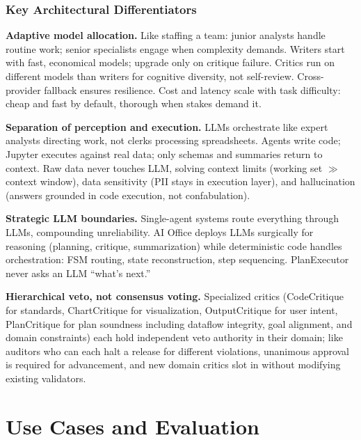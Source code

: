 \documentclass[sigconf]{acmart}
\begin{document}
\subsubsection{Key Architectural Differentiators}

\textbf{Adaptive model allocation.}\label{sec:adaptive-allocation} Like staffing a team: junior analysts handle routine work; senior specialists engage when complexity demands. Writers start with fast, economical models; upgrade only on critique failure. Critics run on different models than writers for cognitive diversity, not self-review. Cross-provider fallback ensures resilience. Cost and latency scale with task difficulty: cheap and fast by default, thorough when stakes demand it.

\textbf{Separation of perception and execution.} LLMs orchestrate like expert analysts directing work, not clerks processing spreadsheets. Agents write code; Jupyter executes against real data; only schemas and summaries return to context. Raw data never touches LLM, solving context limits (working set $\gg$ context window), data sensitivity (PII stays in execution layer), and hallucination (answers grounded in code execution, not confabulation).

\textbf{Strategic LLM boundaries.} Single-agent systems route everything through LLMs, compounding unreliability. AI Office deploys LLMs surgically for reasoning (planning, critique, summarization) while deterministic code handles orchestration: FSM routing, state reconstruction, step sequencing. PlanExecutor never asks an LLM ``what's next.''

\textbf{Hierarchical veto, not consensus voting.} Specialized critics (CodeCritique for standards, ChartCritique for visualization, OutputCritique for user intent, PlanCritique for plan soundness including dataflow integrity, goal alignment, and domain constraints) each hold independent veto authority in their domain; like auditors who can each halt a release for different violations, unanimous approval is required for advancement, and new domain critics slot in without modifying existing validators.



\section{Use Cases and Evaluation}
\label{sec:evaluation}
\end{document}
